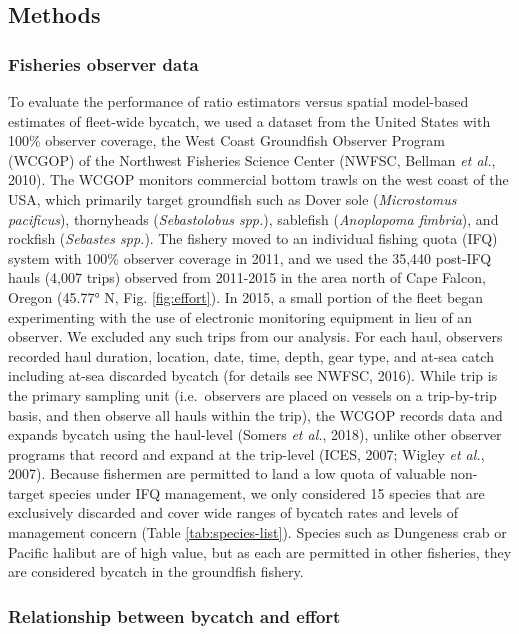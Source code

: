 \documentclass[]{article}
\begin{document}
\subsection{Methods}\label{methods}

\subsubsection{Fisheries observer data}\label{fisheries-observer-data}

To evaluate the performance of ratio estimators versus spatial
model-based estimates of fleet-wide bycatch, we used a dataset from the
United States with 100\% observer coverage, the West Coast Groundfish
Observer Program (WCGOP) of the Northwest Fisheries Science Center
(NWFSC, Bellman \emph{et al.}, 2010). The WCGOP monitors commercial
bottom trawls on the west coast of the USA, which primarily target
groundfish such as Dover sole (\emph{Microstomus pacificus}),
thornyheads (\emph{Sebastolobus spp.}), sablefish (\emph{Anoplopoma
fimbria}), and rockfish (\emph{Sebastes spp.}). The fishery moved to an
individual fishing quota (IFQ) system with 100\% observer coverage in
2011, and we used the 35,440 post-IFQ hauls (4,007 trips) observed from
2011-2015 in the area north of Cape Falcon, Oregon (45.77° N, Fig.
\ref{fig:effort}). In 2015, a small portion of the fleet began
experimenting with the use of electronic monitoring equipment in lieu of
an observer. We excluded any such trips from our analysis. For each
haul, observers recorded haul duration, location, date, time, depth,
gear type, and at-sea catch including at-sea discarded bycatch (for
details see NWFSC, 2016). While trip is the primary sampling unit
(i.e.~observers are placed on vessels on a trip-by-trip basis, and then
observe all hauls within the trip), the WCGOP records data and expands
bycatch using the haul-level (Somers \emph{et al.}, 2018), unlike other
observer programs that record and expand at the trip-level (ICES, 2007;
Wigley \emph{et al.}, 2007). Because fishermen are permitted to land a
low quota of valuable non-target species under IFQ management, we only
considered 15 species that are exclusively discarded and cover wide
ranges of bycatch rates and levels of management concern (Table
\ref{tab:species-list}). Species such as Dungeness crab or Pacific
halibut are of high value, but as each are permitted in other fisheries,
they are considered bycatch in the groundfish fishery.

\subsubsection{Relationship between bycatch and
effort}\label{relationship-between-bycatch-and-effort}
\end{document}
